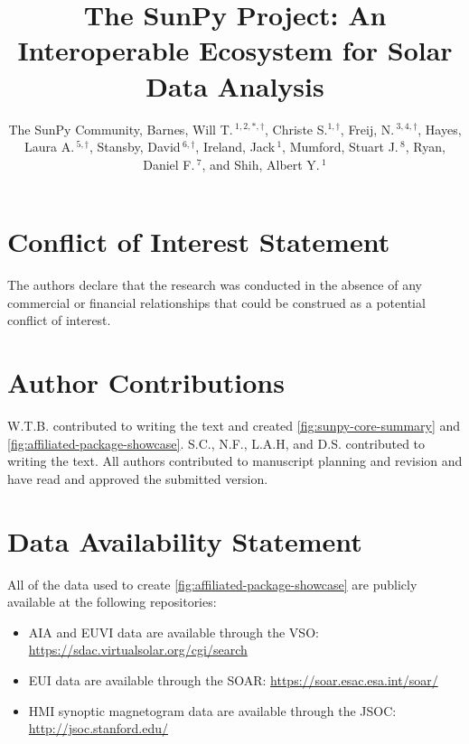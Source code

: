 \documentclass[utf8]{FrontiersinHarvard}
\def\firstAuthorLast{The SunPy Community {et~al.}}
\def\Authors{
The SunPy Community,
Barnes, Will T.\,$^{1,2,*,\dagger}$,
Christe S.$^{1,\dagger}$,
Freij, N.\,$^{3,4,\dagger}$,
Hayes, Laura A.\,$^{5,\dagger}$,
Stansby, David\,$^{6,\dagger}$,
Ireland, Jack\,$^{1}$,
Mumford, Stuart J.\,$^{8}$,
Ryan, Daniel F.\,$^{7}$,
and Shih, Albert Y.\,$^{1}$
}
\begin{document}
\onecolumn
{}
\title[]{The SunPy Project: An Interoperable Ecosystem for Solar Data Analysis}
\author[\firstAuthorLast]{\Authors}
\address{}
\correspondance{}
\extraAuth{}
\maketitle










\section*{Conflict of Interest Statement}
\label{sec:conflict-of-interest-statement}

The authors declare that the research was conducted in the absence of any commercial or financial relationships that could be construed as a potential conflict of interest.

\section*{Author Contributions}
\label{sec:author-contributions}

W.T.B. contributed to writing the text and created \autoref{fig:sunpy-core-summary} and \autoref{fig:affiliated-package-showcase}.
S.C., N.F., L.A.H, and D.S. contributed to writing the text.
All authors contributed to manuscript planning and revision and have read and approved the submitted version.

\section*{Data Availability Statement}
\label{sec:data-availability-statement}

All of the data used to create \autoref{fig:affiliated-package-showcase} are publicly available at the following repositories:

\begin{itemize}
    \item AIA and EUVI data are available through the VSO: \url{https://sdac.virtualsolar.org/cgi/search}
    \item EUI data are available through the SOAR: \url{https://soar.esac.esa.int/soar/}
    \item HMI synoptic magnetogram data are available through the JSOC: \url{http://jsoc.stanford.edu/}
\end{itemize}
\end{document}
